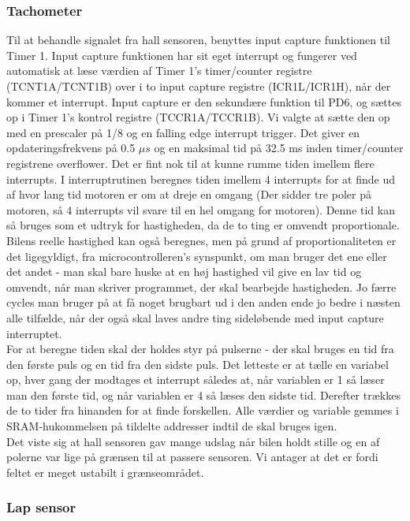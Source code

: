 \subsubsection{Tachometer}

Til at behandle signalet fra hall sensoren, benyttes input capture funktionen til Timer 1. Input capture funktionen har sit eget interrupt og fungerer ved automatisk at læse værdien af Timer 1's timer/counter registre (TCNT1A/TCNT1B) over i to input capture registre (ICR1L/ICR1H), når der kommer et interrupt. Input capture er den sekundære funktion til PD6, og sættes op i Timer 1's kontrol registre (TCCR1A/TCCR1B). Vi valgte at sætte den op med en prescaler på 1/8 og en falling edge interrupt trigger. Det giver en opdateringsfrekvens på 0.5 $\mu s$ og en maksimal tid på 32.5 ms inden timer/counter registrene overflower. Det er fint nok til at kunne rumme tiden imellem flere interrupts. I interruptrutinen beregnes tiden imellem 4 interrupts for at finde ud af hvor lang tid motoren er om at dreje en omgang (Der sidder tre poler på motoren, så 4 interrupts vil svare til en hel omgang for motoren). Denne tid kan så bruges som et udtryk for hastigheden, da de to ting er omvendt proportionale. Bilens reelle hastighed kan også beregnes, men på grund af proportionaliteten er det ligegyldigt, fra microcontrolleren's synspunkt, om man bruger det ene eller det andet - man skal bare huske at en høj hastighed vil give en lav tid og omvendt, når man skriver programmet, der skal bearbejde hastigheden. Jo færre cycles man bruger på at få noget brugbart ud i den anden ende jo bedre i næsten alle tilfælde, når der også skal laves andre ting sideløbende med input capture interruptet.\\
For at beregne tiden skal der holdes styr på pulserne - der skal bruges en tid fra den første puls og en tid fra den sidste puls. Det letteste er at tælle en variabel op, hver gang der modtages et interrupt således at, når variablen er 1 så læser man den første tid, og når variablen er 4 så læses den sidste tid. Derefter trækkes de to tider fra hinanden for at finde forskellen. Alle værdier og variable gemmes i SRAM-hukommelsen på tildelte addresser indtil de skal bruges igen.\\

Det viste sig at hall sensoren gav mange udslag når bilen holdt stille og en af polerne var lige på grænsen til at passere sensoren. Vi antager at det er fordi feltet er meget ustabilt i grænseområdet. 


\subsubsection{Lap sensor}

